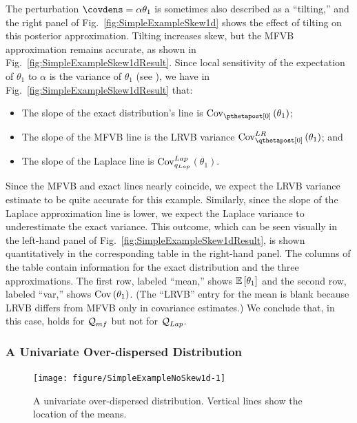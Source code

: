 \documentclass{article}\usepackage[]{graphicx}\usepackage[]{color}
\newenvironment{knitrout}{}{}
\theoremstyle{definition}
\theoremstyle{plain}
\theoremstyle{plain}
\theoremstyle{plain}
\theoremstyle{definition}
\theoremstyle{plain}
\theoremstyle{plain}
\newcommand{\fig}[1]{Fig.~\ref{fig:#1}}
\begin{document}
The perturbation $\covdens=\alpha\theta_{1}$ is sometimes also described
as a ``tilting,'' and the right panel of \fig{SimpleExampleSkew1d}
shows the effect of tilting on this posterior approximation. Tilting
increases skew, but the MFVB approximation remains accurate, as shown
in \fig{SimpleExampleSkew1dResult}. Since local sensitivity of
the expectation of $\theta_{1}$ to $\alpha$ is the variance of $\theta_{1}$
(see ), we have in
\fig{SimpleExampleSkew1dResult} that:
\begin{itemize}
\item The slope of the exact distribution's line is
    $\pcov\left(\theta_{1}\right)$;
\item The slope of the MFVB line is the LRVB variance
    $\lrvbcov\left(\theta_{1}\right)$; and
\item The slope of the Laplace line is $\mathrm{Cov}_{q_{Lap}}^{Lap}$$\left(\theta_{1}\right)$.
\end{itemize}
Since the MFVB and exact lines nearly coincide, we expect the LRVB
variance estimate to be quite accurate for this example. Similarly, since the
slope of the Laplace approximation line is lower, we expect the Laplace variance
to underestimate the exact variance. This outcome, which can be seen visually
in the left-hand panel of \fig{SimpleExampleSkew1dResult}, is shown
quantitatively in the corresponding table in the right-hand panel. The
columns of the table contain information for the exact distribution and the
three approximations. The first row, labeled ``mean,'' shows
$\mathbb{E}\left[\theta_1\right]$ and the second row, labeled ``var,'' shows
$\mathrm{Cov}\left(\theta_1\right)$. (The ``LRVB'' entry for the mean is blank because
LRVB differs from MFVB only in covariance estimates.) We conclude that, in this
case,  holds for $\mathcal{Q}_{mf}$ but not for $\mathcal{Q}_{Lap}$.

\subsubsection{A Univariate Over-dispersed Distribution}

\begin{knitrout}
\color{fgcolor}\begin{figure}[t]

{\centering \texttt{[image: figure/SimpleExampleNoSkew1d-1]} 

}

\caption[A univariate over-dispersed distribution]{A univariate over-dispersed distribution. Vertical lines show the location of the means.}\label{fig:SimpleExampleNoSkew1d}
\end{figure}


\end{knitrout}
\end{document}
